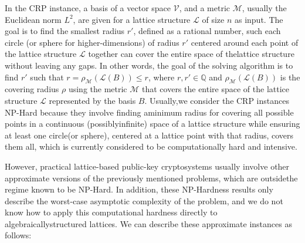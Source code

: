 \documentclass[runningheads]{llncs}
\numberwithin{equation}{section}
\begin{document}
\begin{enumerate}
        In the CRP instance, a basis of a vector space $\mathcal{V}$, and a metric $\mathcal{M}$, usually the Euclidean norm ${L}^{2}$, are given for a lattice structure $\mathcal{L}$ of size $n$ as input. The goal is to find the smallest radius $r'$, defined as a rational number, such each circle (or sphere for higher-dimensions) of radius $r'$ centered around each point of the lattice structure $\mathcal{L}$ together can cover the entire space of the\break lattice structure without leaving any gaps. In other words, the goal of the solving algorithm is to find $r'$ such that $r = {\rho}_{\mathcal{M}}(\mathcal{L}(B)) \leq r$, where $r, r' \in \mathbb{Q}$ and ${\rho}_{\mathcal{M}}(\mathcal{L}(B))$ is the covering radius $\rho$ using the metric $\mathcal{M}$ that covers the entire space of the lattice structure $\mathcal{L}$ represented by the basis $B$. Usually,\break we consider the CRP instances NP-Hard because they involve finding a\break minimum radius for covering all possible points in a continuous (possibly\break infinite) space of a lattice structure while ensuring at least one circle\break (or sphere), centered at a lattice point with that radius, covers them all, which is currently considered to be computationally hard and intensive.
                
    \end{enumerate}

    \vspace{2ex}

    \noindent However, practical lattice-based public-key cryptosystems usually involve other approximate versions of the previously mentioned problems, which are outside\break the regime known to be NP-Hard. In addition, these NP-Hardness results only describe the worst-case asymptotic complexity of the problem, and we do not know how to apply this computational hardness directly to algebraically\break structured lattices. We can describe these approximate instances as follows:
\end{document}
